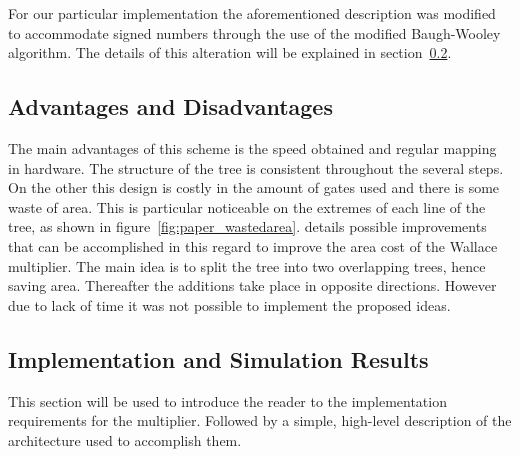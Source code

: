 For our particular implementation the aforementioned description was modified to accommodate signed numbers through the use of the modified Baugh-Wooley algorithm. The details of this alteration will be explained in section~\ref{sec:implementation}.

\subsection{Advantages and Disadvantages}

The main advantages of this scheme is the speed obtained and regular mapping in hardware. The structure of the tree is consistent throughout the several steps. On the other this design is costly in the amount of gates used and there is some waste of area. This is particular noticeable on the extremes of each line of the tree, as shown in figure~\ref{fig:paper_wastedarea}. \cite{betterwallace} details possible improvements that can be accomplished in this regard to improve the area cost of the Wallace multiplier. The main idea is to split the tree into two overlapping trees, hence saving area. Thereafter the additions take place in opposite directions. 
However due to lack of time it was not possible to implement the proposed ideas.

\begin{figure}[H]
\centering

\qquad
{}
\caption{}
\label{fig:paper}
\end{figure}


\subsection{Implementation and Simulation Results}
\label{sec:implementation}

This section will be used to introduce the reader to the implementation requirements for the multiplier. Followed by a simple, high-level description of the architecture used to accomplish them.

